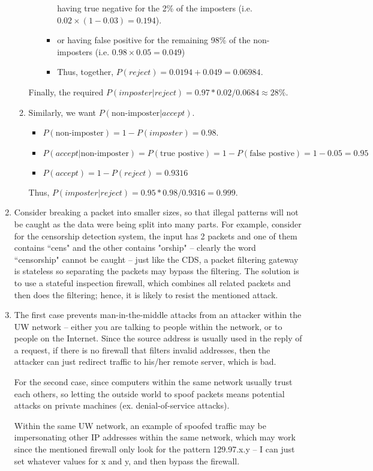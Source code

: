 \documentclass[12pt]{article}
\begin{document}
\begin{enumerate}
\begin{enumerate}
\begin{itemize}
\begin{itemize}
having true negative for the 2\% of the imposters (i.e. $0.02 \times (1-0.03) = 0.194$).
\item
or having false positive for the remaining 98\% of the non-imposters (i.e. $0.98 \times 0.05 = 0.049$)
\item
Thus, together, $P(reject) = 0.0194 + 0.049 = 0.06984$.
\end{itemize}
\end{itemize}
Finally, the required $P(imposter|reject) = 0.97 * 0.02 / 0.0684 \approx 28\%$.
\item
Similarly, we want $P(\text{non-imposter} | accept)$.
\begin{itemize}
\item
$P(\text{non-imposter}) = 1-P(imposter) = 0.98$.
\item
$P(accept|\text{non-imposter}) = P(\text{true postive}) = 1-P(\text{false postive}) = 1-0.05 = 0.95$
\item
$P(accept) = 1-P(reject) = 0.9316$
\end{itemize}
Thus, $P(imposter|reject) = 0.95 * 0.98 / 0.9316 = 0.999$.
\end{enumerate}
\item
Consider breaking a packet into smaller sizes, so that illegal patterns will not be caught as the data were being split into many parts.
For example, consider for the censorship detection system, the input has 2 packets and one of them contains ``cens" and the other contains "orship" -- clearly the word ``censorship" cannot be caught -- just like the CDS, a packet filtering gateway is stateless so separating the packets may bypass the filtering.
The solution is to use a stateful inspection firewall, which combines all related packets and then does the filtering; hence, it is likely to resist the mentioned attack.
\item
The first case prevents man-in-the-middle attacks from an attacker within the UW network -- either you are talking to people within the network, or to people on the Internet.
Since the source address is usually used in the reply of a request, if there is no firewall that filters invalid addresses, then the attacker can just redirect traffic to his/her remote server, which is bad.

For the second case, since computers within the same network usually trust each others, so letting the outside world to spoof packets means potential attacks on private machines (ex. denial-of-service attacks).

Within the same UW network, an example of spoofed traffic may be impersonating other IP addresses within the same network, which may work since the mentioned firewall only look for the pattern 129.97.x.y -- I can just set whatever values for x and y, and then bypass the firewall.
\end{enumerate}
\end{document}
